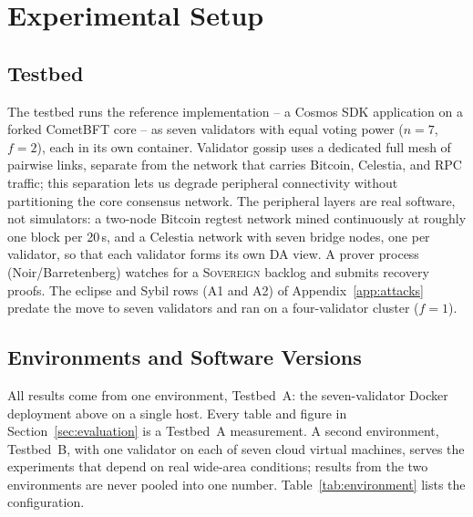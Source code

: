\section{Experimental Setup}
\label{sec:setup}

\subsection{Testbed}

The testbed runs the reference implementation -- a Cosmos SDK application on
a forked CometBFT core -- as seven validators with equal voting power
($n{=}7$, $f{=}2$), each in its own container. Validator gossip uses a
dedicated full mesh of pairwise links, separate from the network that
carries Bitcoin, Celestia, and RPC traffic; this separation lets us degrade
peripheral connectivity without partitioning the core consensus network.
The peripheral layers are real software, not simulators: a two-node Bitcoin
regtest network mined continuously at roughly one block per 20\,s, and a
Celestia network with seven bridge nodes, one per validator, so that each
validator forms its own DA view. A prover process (Noir/Barretenberg)
watches for a \textsc{Sovereign} backlog and submits recovery proofs. The
eclipse and Sybil rows (A1 and A2) of Appendix~\ref{app:attacks} predate the
move to seven validators and ran on a four-validator cluster ($f{=}1$).

\subsection{Environments and Software Versions}
\label{subsec:environment}

All results come from one environment, Testbed~A: the seven-validator Docker
deployment above on a single host. Every table and figure in
Section~\ref{sec:evaluation} is a Testbed~A measurement.
\iftestbedB A second environment, Testbed~B, with one validator on each of
seven cloud virtual machines, serves the experiments that depend on real
wide-area conditions; results from the two environments are never pooled into
one number.\fi{} Table~\ref{tab:environment} lists the configuration.

